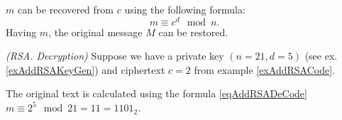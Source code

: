 $m$ can be recovered from $c$ using the following formula:
\begin{equation}
m \equiv c^d \mod{n}.
\label{eqAddRSADeCode}
\end{equation}
Having $m$, the original message $M$ can be restored.
\begin{example}
\emph{(RSA. Decryption)}
Suppose we have a private key $\left(n=21, d=5\right)$ (see ex. \ref{exAddRSAKeyGen}) and ciphertext $c = 2$ from example \ref{exAddRSACode}.

The original text is calculated using the formula \eqref{eqAddRSADeCode} $m \equiv 2^5 \mod{21} = 11 = 1101_2$.
\label{exAddRSADeCode}
\end{example}